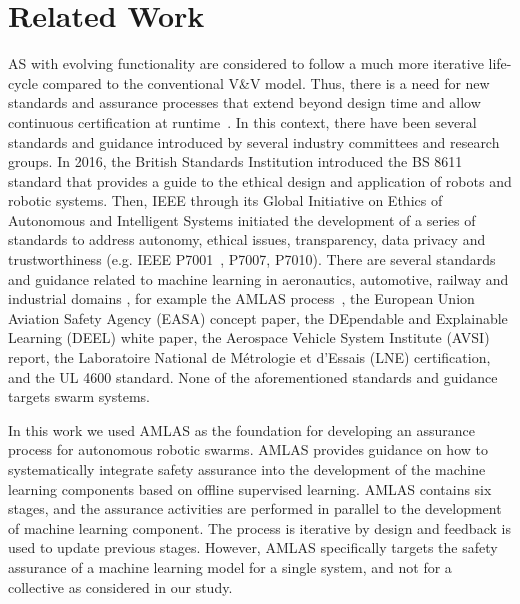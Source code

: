 \documentclass[runningheads]{llncs}
\begin{document}
\section{Related Work}\label{relatedwork}%
AS with evolving functionality are considered to follow a much more iterative life-cycle compared to the conventional V\&V model. 
Thus, there is a need for new standards and assurance processes that extend beyond design time and allow continuous certification at runtime~\cite{Rushby2008}. 
In this context, there have been several standards and guidance introduced by several industry committees and research groups. In 2016, the British Standards Institution introduced the BS 8611 standard that provides a guide to the ethical design and application of robots and robotic systems. %
Then, IEEE through its Global Initiative on Ethics of Autonomous and Intelligent Systems initiated the development of a series of standards to address autonomy, ethical issues, transparency, data privacy and trustworthiness (e.g. IEEE P7001~\cite{IEEE-P7001}, P7007, P7010). 
There are several standards and guidance related to machine learning in aeronautics, automotive, railway and industrial domains \cite{Kaakai2022}, for example the AMLAS process~\cite{Hawkins2021}, the European Union Aviation Safety Agency (EASA) concept paper, the DEpendable and Explainable Learning (DEEL) white paper, the Aerospace Vehicle System Institute (AVSI) report, the Laboratoire National de Métrologie et d'Essais (LNE) certification, and the UL 4600 standard. None of the aforementioned standards and guidance targets swarm systems.

In this work we used AMLAS \cite{Hawkins2021} as the foundation for developing an assurance process for autonomous robotic swarms. AMLAS provides guidance on how to systematically integrate safety assurance into the development of the machine learning components based on offline supervised learning. 
AMLAS contains six stages, and the assurance activities are performed in parallel to the development of machine learning component. 
The process is iterative by design and feedback is used to update previous stages. 
However, AMLAS specifically targets the safety assurance of a machine learning model for a single system, and not for a collective as considered in our study.  
\end{document}
